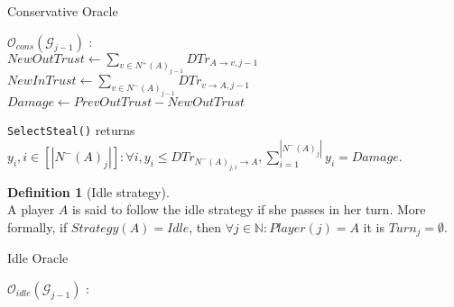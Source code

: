 \documentclass[11pt]{article}
\theoremstyle{definition}
\newtheorem{definition}{Definition}[section]
\theoremstyle{corollary}
\theoremstyle{lemma}
\begin{document}
      \begin{algorithm}[H]
         \label{conservativeoracle}
         \caption{Conservative Oracle}
         $\mathcal{O}_{cons}(\mathcal{G}_{j-1})$ : \\ {
            $NewOutTrust \gets \sum\limits_{v \in N^{+}(A)_{j-1}}DTr_{A \rightarrow v, j-1}$ \\
            $NewInTrust \gets \sum\limits_{v \in N^{-}(A)_{j-1}}DTr_{v \rightarrow A, j-1}$ \\
            $Damage \gets PrevOutTrust - NewOutTrust$ \\
            }
      \end{algorithm}
      \texttt{SelectSteal()} returns $y_i, i \in [|N^{-}(A)_j|] : \forall i, y_i \leq DTr_{N^{-}(A)_{j,i} \rightarrow A},
      \sum\limits_{i=1}^{|N^{-}(A)_j|}y_i = Damage$. 
      \begin{definition}[Idle strategy] \ \\
         A player $A$ is said to follow the idle strategy if she passes in her turn. More formally, if $Strategy(A) =
         Idle$, then $\forall j \in \mathbb{N} : Player(j) = A$ it is $Turn_j = \emptyset$.
      \end{definition}
      \begin{algorithm}[H]
         \label{idleoracle}
         \caption{Idle Oracle}
         $\mathcal{O}_{idle}(\mathcal{G}_{j-1})$ : \\ {
            \Return{$\emptyset$}}
      \end{algorithm}
\end{document}
